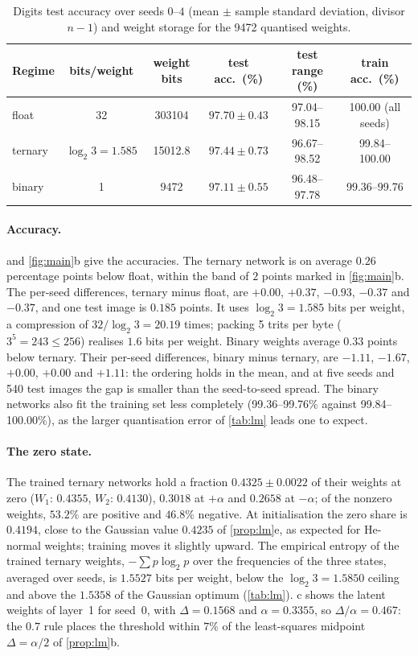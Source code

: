 \documentclass[11pt]{article}
\theoremstyle{definition}\newtheorem{definition}[theorem]{Definition}
\theoremstyle{remark}\newtheorem{remark}[theorem]{Remark}
\begin{document}
\begin{table}[t]
\centering\small
\caption{Digits test accuracy over seeds $0$--$4$ (mean $\pm$ sample standard deviation, divisor $n-1$) and weight storage for the 9472 quantised weights.}\label{tab:twn}
\begin{tabular}{@{}lccccc@{}}
\toprule
Regime & bits/weight & weight bits & test acc.\ (\%) & test range (\%) & train acc.\ (\%)\\
\midrule
float & 32 & 303104 & $97.70\pm0.43$ & 97.04--98.15 & 100.00 (all seeds)\\
ternary & $\log_{2}3=1.585$ & 15012.8 & $97.44\pm0.73$ & 96.67--98.52 & 99.84--100.00\\
binary & 1 & 9472 & $97.11\pm0.55$ & 96.48--97.78 & 99.36--99.76\\
\bottomrule
\end{tabular}
\end{table}

\paragraph{Accuracy.}  and \cref{fig:main}b give the accuracies. The ternary network is on average $0.26$ percentage points below float, within the band of $2$ points marked in \cref{fig:main}b. The per-seed differences, ternary minus float, are $+0.00$, $+0.37$, $-0.93$, $-0.37$ and $-0.37$, and one test image is $0.185$ points. It uses $\log_{2}3=1.585$ bits per weight, a compression of $32/\log_{2}3=20.19$ times; packing 5 trits per byte ($3^5=243\le256$) realises $1.6$ bits per weight. Binary weights average $0.33$ points below ternary. Their per-seed differences, binary minus ternary, are $-1.11$, $-1.67$, $+0.00$, $+0.00$ and $+1.11$: the ordering holds in the mean, and at five seeds and 540 test images the gap is smaller than the seed-to-seed spread. The binary networks also fit the training set less completely (99.36--99.76\% against 99.84--100.00\%), as the larger quantisation error of \cref{tab:lm} leads one to expect.

\paragraph{The zero state.} The trained ternary networks hold a fraction $0.4325\pm0.0022$ of their weights at zero ($W_1$: $0.4355$, $W_2$: $0.4130$), $0.3018$ at $+\alpha$ and $0.2658$ at $-\alpha$; of the nonzero weights, $53.2\%$ are positive and $46.8\%$ negative. At initialisation the zero share is $0.4194$, close to the Gaussian value $0.4235$ of \cref{prop:lm}e, as expected for He-normal weights; training moves it slightly upward. The empirical entropy of the trained ternary weights, $-\sum p\log_2p$ over the frequencies of the three states, averaged over seeds, is $1.5527$ bits per weight, below the $\log_{2}3=1.5850$ ceiling and above the $1.5358$ of the Gaussian optimum (\cref{tab:lm}). c shows the latent weights of layer~1 for seed~0, with $\Delta=0.1568$ and $\alpha=0.3355$, so $\Delta/\alpha=0.467$: the $0.7$ rule places the threshold within $7\%$ of the least-squares midpoint $\Delta=\alpha/2$ of \cref{prop:lm}b.
\end{document}
